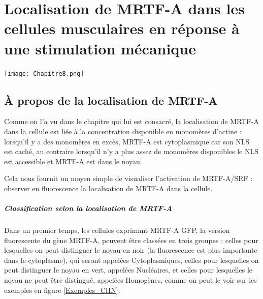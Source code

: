 %
%
%

\chapter{Localisation de MRTF-A dans les cellules musculaires en réponse à une stimulation mécanique}
\begin{center}
\texttt{[image: Chapitre8.png]}

\end{center}
\newpage
\section{À propos de la localisation de MRTF-A}

 Comme on l'a vu dans le chapitre qui lui est consacré, la localisation de MRTF-A dans la cellule est liée à la concentration disponible en monomères d'actine : lorsqu'il y a des monomères en excès, MRTF-A est cytoplasmique car son NLS est caché, au contraire lorsqu'il n'y a plus assez de monomères disponibles le NLS est accessible et MRTF-A est dans le noyau. 
 
 Cela nous fournit un moyen simple de visualiser l'activation de MRTF-A/SRF : observer en fluorescence la localisation de MRTF-A dans la cellule. 
 
 \paragraph{Classification selon la localisation de MRTF-A}
 
 Dans un premier temps, les cellules exprimant MRTF-A GFP, la version fluorescente du gène MRTF-A, peuvent être classées en trois groupes : celles pour lesquelles on peut distinguer le noyau en noir (la fluorescence est plus importante dans le cytoplasme), qui seront appelées Cytoplasmiques, celles pour lesquelles on peut distinguer le noyau en vert, appelées Nucléaires, et celles pour lesquelles le noyau ne peut être distingué, appelées Homogènes, comme on peut le voir sur les exemples en figure  \ref{Exemples_CHN}.
 
